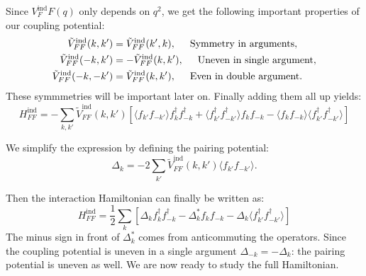Since $V^\text{ind}_FF(q)$ only depends on $q^2$, we get the following important properties of our coupling potential: 
\begin{align}
\tilde{V}^\text{ind}_{FF}(k,k') &= \tilde{V}^\text{ind}_{FF}(k',k), \hspace{0.5cm} \text{Symmetry in arguments}, \nonumber \\
\tilde{V}^\text{ind}_{FF}(-k,k') &= -\tilde{V}^\text{ind}_{FF}(k,k'), \hspace{0.5cm} \text{Uneven in single argument}, \nonumber \\
\tilde{V}^\text{ind}_{FF}(-k,-k') &= \tilde{V}^\text{ind}_{FF}(k,k'), \hspace{0.5cm} \text{Even in double argument}.
\end{align}
These symmmetries will be important later on. Finally adding them all up yields: 
\begin{equation}
H^\text{ind}_{FF} = -\sum_{k,k'} \tilde{V}^\text{ind}_{FF}(k,k')\left[ \langle f_{k'}f_{-k'} \rangle f^\dagger_k f^\dagger_{-k} + \langle f^\dagger_{k'}f^\dagger_{-k'} \rangle f_k f_{-k} - \langle f_{k}f_{-k} \rangle  \langle f^\dagger_{k'}f^\dagger_{-k'} \rangle \right] \nonumber
\end{equation}

We simplify the expression by defining the pairing potential:
\begin{equation}
\Delta_k = -2\sum_{k'}\tilde{V}^\text{ind}_{FF}(k,k')\langle f_{k'}f_{-k'} \rangle.
\end{equation}

Then the interaction Hamiltonian can finally be written as:
\begin{equation}
H^\text{ind}_{FF} = \frac{1}{2}\sum_{k} \left[ \Delta_k f^\dagger_k f^\dagger_{-k} - \Delta^*_k f_k f_{-k} - \Delta_k \langle f^\dagger_{k'}f^\dagger_{-k'} \rangle \right]
\label{eq.HFFintfinal}
\end{equation}
The minus sign in front of $\Delta^*_k$ comes from anticommuting the operators. Since the coupling potential is uneven in a single argument $\Delta_{-k} = -\Delta_k$: the pairing potential is uneven as well. We are now ready to study the full Hamiltonian.

